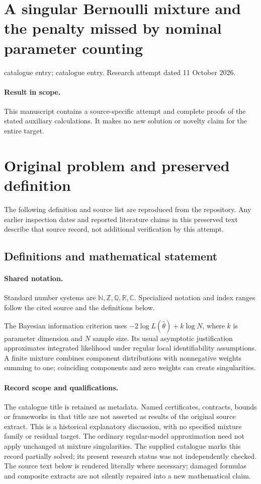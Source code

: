 \documentclass[11pt]{article}
\begin{document}
\section*{A singular Bernoulli mixture and the penalty missed by nominal parameter counting}
\noindent catalogue entry; catalogue entry. Research attempt dated 11 October 2026.
\paragraph{Result in scope.}This manuscript contains a source-specific attempt and complete proofs of the stated auxiliary calculations. It makes no new solution or novelty claim for the entire target.
\section{Original problem and preserved definition}
The following definition and source list are reproduced from the repository. Any earlier inspection dates and reported literature claims in this preserved text describe that source record, not additional verification by this attempt.
\subsection{Definitions and mathematical statement}

\paragraph{Shared notation.}Standard number systems are $\mathbb N,\mathbb Z,\mathbb Q,\mathbb R,\mathbb C$. Specialized notation and index ranges follow the cited source and the definitions below.


The Bayesian information criterion uses $-2\log L(\widehat\theta)+k\log N$, where $k$ is parameter dimension and $N$ sample size. Its usual asymptotic justification approximates integrated likelihood under regular local identifiability assumptions. A finite mixture combines component distributions with nonnegative weights summing to one; coinciding components and zero weights can create singularities.
\paragraph{Record scope and qualifications.}
The catalogue title is retained as metadata. Named certificates, contracts, bounds or frameworks in that title are not asserted as results of the original source extract.
This is a historical explanatory discussion, with no specified mixture family or residual target. The ordinary regular-model approximation need not apply unchanged at mixture singularities. The supplied catalogue marks this record partially solved; its present research status was not independently checked.
The source text below is rendered literally where necessary; damaged formulas and composite extracts are not silently repaired into a new mathematical claim.
\end{document}
